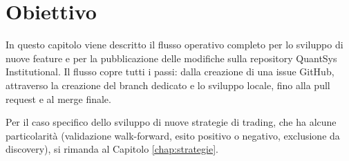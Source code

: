 \section{Obiettivo}

In questo capitolo viene descritto il flusso operativo completo per lo sviluppo di nuove feature e per la pubblicazione delle modifiche sulla repository QuantSys Institutional. Il flusso copre tutti i passi: dalla creazione di una issue GitHub, attraverso la creazione del branch dedicato e lo sviluppo locale, fino alla pull request e al merge finale.

Per il caso specifico dello sviluppo di nuove strategie di trading, che ha alcune particolarità (validazione walk-forward, esito positivo o negativo, exclusione da discovery), si rimanda al Capitolo \ref{chap:strategie}.
